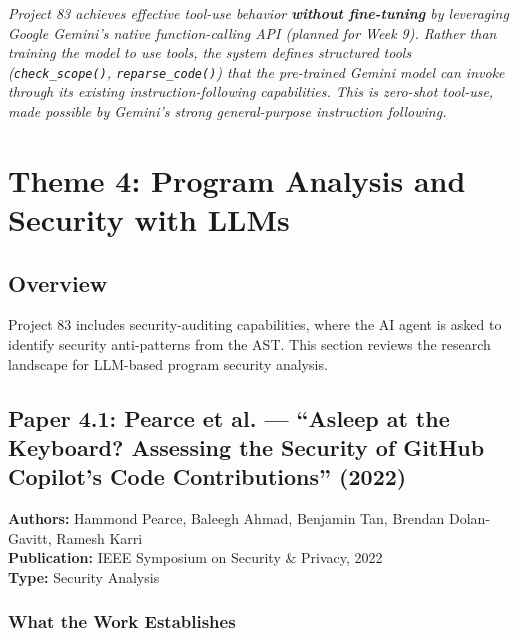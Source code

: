 \documentclass[a4paper,11pt]{article}
\newcommand{\oursolution}[1]{%
  \begin{tcolorbox}[colback=green!5!white, colframe=green!60!black, title={How Project 83 Solves This Gap}]
  \textit{#1}
  \end{tcolorbox}
}
\begin{document}
\oursolution{Project 83 achieves effective tool-use behavior \textbf{without fine-tuning} by leveraging Google Gemini's native function-calling API (planned for Week 9). Rather than training the model to use tools, the system \textit{defines} structured tools (\texttt{check\_scope()}, \texttt{reparse\_code()}) that the pre-trained Gemini model can invoke through its existing instruction-following capabilities. This is zero-shot tool-use, made possible by Gemini's strong general-purpose instruction following.}

\newpage

\section{Theme 4: Program Analysis and Security with LLMs}

\subsection{Overview}

Project 83 includes security-auditing capabilities, where the AI agent is asked to identify security anti-patterns from the AST. This section reviews the research landscape for LLM-based program security analysis.

\subsection{Paper 4.1: Pearce et al. --- ``Asleep at the Keyboard? Assessing the Security of GitHub Copilot's Code Contributions'' (2022)}

\begin{tcolorbox}[colback=gray!5, colframe=gray!40]
\textbf{Authors:} Hammond Pearce, Baleegh Ahmad, Benjamin Tan, Brendan Dolan-Gavitt, Ramesh Karri \\
\textbf{Publication:} IEEE Symposium on Security \& Privacy, 2022 \\
\textbf{Type:} Security Analysis
\end{tcolorbox}

\subsubsection{What the Work Establishes}
\end{document}
